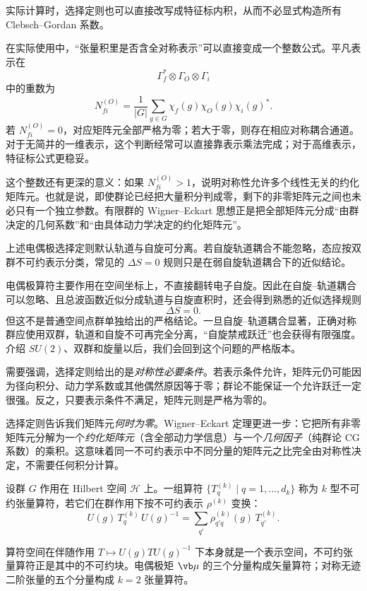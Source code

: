 实际计算时，选择定则也可以直接改写成特征标内积，从而不必显式构造所有 Clebsch--Gordan 系数。

在实际使用中，“张量积里是否含全对称表示”可以直接变成一个整数公式。平凡表示在
\[
\Gamma_f^*\otimes\Gamma_O\otimes\Gamma_i
\]
中的重数为
\[
N_{fi}^{(O)}
=\frac1{|G|}
\sum_{g\in G}
\chi_f(g)
\chi_O(g)
\chi_i(g)^*.
\label{eq:selection-character-count}
\]
若 $N_{fi}^{(O)}=0$，对应矩阵元全部严格为零；若大于零，则存在相应对称耦合通道。对于无简并的一维表示，这个判断经常可以直接靠表示乘法完成；对于高维表示，特征标公式更稳妥。

这个整数还有更深的意义：如果 $N_{fi}^{(O)}>1$，说明对称性允许多个线性无关的约化矩阵元。也就是说，即使群论已经把大量积分判成零，剩下的非零矩阵元之间也未必只有一个独立参数。有限群的 Wigner--Eckart 思想正是把全部矩阵元分成“由群决定的几何系数”和“由具体动力学决定的约化矩阵元”。

上述电偶极选择定则默认轨道与自旋可分离。若自旋轨道耦合不能忽略，态应按双群不可约表示分类，常见的 $\Delta S=0$ 规则只是在弱自旋轨道耦合下的近似结论。

电偶极算符主要作用在空间坐标上，不直接翻转电子自旋。因此在自旋--轨道耦合可以忽略、且总波函数近似分成轨道与自旋直积时，还会得到熟悉的近似选择规则
\[
\Delta S=0.
\]
但这不是普通空间点群单独给出的严格结论。一旦自旋--轨道耦合显著，正确对称群应使用双群，轨道和自旋不可再完全分离，“自旋禁戒跃迁”也会获得有限强度。介绍 $SU(2)$、双群和旋量以后，我们会回到这个问题的严格版本。

需要强调，选择定则给出的是\emph{对称性必要条件}。若表示条件允许，矩阵元仍可能因为径向积分、动力学系数或其他偶然原因等于零；群论不能保证一个允许跃迁一定很强。反之，只要表示条件不满足，矩阵元则是严格为零的。

选择定则告诉我们矩阵元\emph{何时为零}。Wigner--Eckart 定理更进一步：它把所有非零矩阵元分解为一个\emph{约化矩阵元}（含全部动力学信息）与一个\emph{几何因子}（纯群论 CG 系数）的乘积。这意味着同一不可约表示中不同分量的矩阵元之比完全由对称性决定，不需要任何积分计算。

\begin{definition}[不可约张量算符]
设群 $G$ 作用在 Hilbert 空间 $\mathcal H$ 上。一组算符 $\{T_q^{(k)}\mid q=1,\dots,d_k\}$ 称为 $k$ 型不可约张量算符，若它们在群作用下按不可约表示 $\rho^{(k)}$ 变换：
\[
U(g)\,T_q^{(k)}\,U(g)^{-1}
=\sum_{q'}\rho^{(k)}_{q'q}(g)\,T_{q'}^{(k)}.
\]
\label{def:irreducible-tensor-operator}
\end{definition}

算符空间在伴随作用 $T\mapsto U(g)TU(g)^{-1}$ 下本身就是一个表示空间，不可约张量算符正是其中的不可约块。电偶极矩 $\vb\mu$ 的三个分量构成矢量算符；对称无迹二阶张量的五个分量构成 $k=2$ 张量算符。

